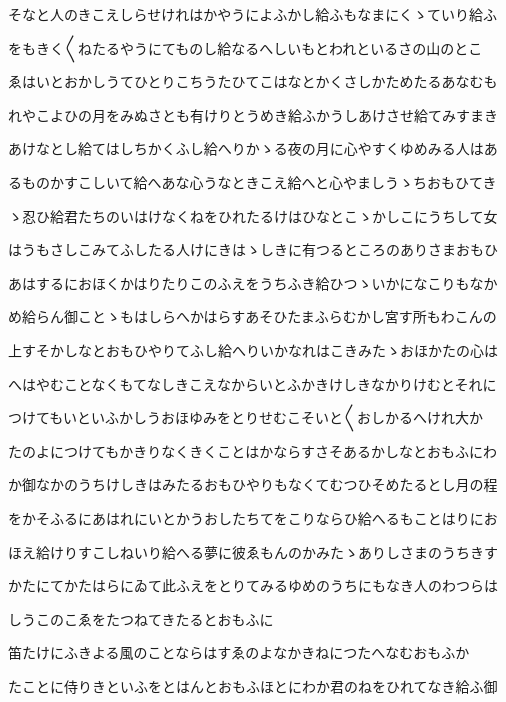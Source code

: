 \documentclass[a4paper,11pt,landscape]{ltjtarticle}
\begin{document}
\par\medskip
そなと人のきこえしらせけれはかやうによふかし給ふもなまにくゝていり給ふ
\par\medskip
をもきく〱ねたるやうにてものし給なるへしいもとわれといるさの山のとこ
\par\medskip
ゑはいとおかしうてひとりこちうたひてこはなとかくさしかためたるあなむも
\par\medskip
れやこよひの月をみぬさとも有けりとうめき給ふかうしあけさせ給てみすまき
\par\medskip
あけなとし給てはしちかくふし給へりかゝる夜の月に心やすくゆめみる人はあ
\par\medskip
るものかすこしいて給へあな心うなときこえ給へと心やましうゝちおもひてき
\par\medskip
ゝ忍ひ給君たちのいはけなくねをひれたるけはひなとこゝかしこにうちして女
\par\medskip
はうもさしこみてふしたる人けにきはゝしきに有つるところのありさまおもひ
\par\medskip
あはするにおほくかはりたりこのふえをうちふき給ひつゝいかになこりもなか
\par\medskip
め給らん御ことゝもはしらへかはらすあそひたまふらむかし宮す所もわこんの
\par\medskip
上すそかしなとおもひやりてふし給へりいかなれはこきみたゝおほかたの心は
\par\medskip
へはやむことなくもてなしきこえなからいとふかきけしきなかりけむとそれに
\par\medskip
つけてもいといふかしうおほゆみをとりせむこそいと〱おしかるへけれ大か
\par\medskip
たのよにつけてもかきりなくきくことはかならすさそあるかしなとおもふにわ
\par\medskip
か御なかのうちけしきはみたるおもひやりもなくてむつひそめたるとし月の程
\par\medskip
をかそふるにあはれにいとかうおしたちてをこりならひ給へるもことはりにお
\par\medskip
ほえ給けりすこしねいり給へる夢に彼ゑもんのかみたゝありしさまのうちきす
\par\medskip
かたにてかたはらにゐて此ふえをとりてみるゆめのうちにもなき人のわつらは
\par\medskip
しうこのこゑをたつねてきたるとおもふに
\par\medskip
笛たけにふきよる風のことならはすゑのよなかきねにつたへなむおもふか
\par\medskip
たことに侍りきといふをとはんとおもふほとにわか君のねをひれてなき給ふ御
\par\medskip
\end{document}
